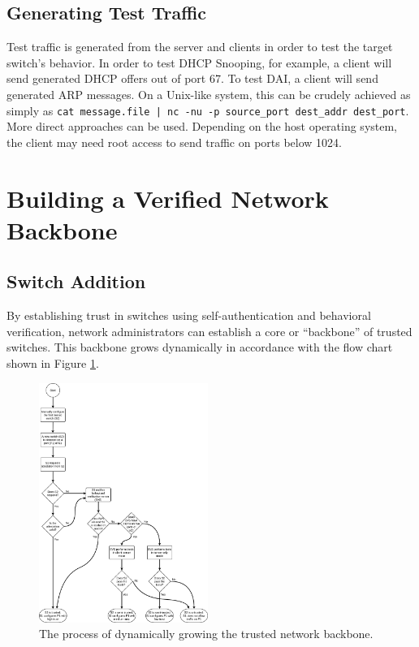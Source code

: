 \documentclass[journal]{IEEEtran}
\begin{document}
\subsection{Generating Test Traffic}
Test traffic is generated from the server and clients in order to test the target switch's behavior.
In order to test DHCP Snooping, for example, a client will send generated DHCP offers out of port
67. To test DAI, a client will send generated ARP messages. On a Unix-like system, this can be
crudely achieved as simply as \texttt{cat message.file | nc -nu -p source\_port dest\_addr
dest\_port}. More direct approaches can be used. Depending on the host operating system, the client
may need root access to send traffic on ports below 1024.


\section{Building a Verified Network Backbone}

\subsection{Switch Addition}
By establishing trust in switches using self-authentication and behavioral verification, network
administrators can establish a core or ``backbone'' of trusted switches. This backbone grows
dynamically in accordance with the flow chart shown in Figure \ref{fig:switch-addition}.

\begin{figure}[tbp]
\centerline{\includegraphics[width=0.49\textwidth]{images/switch-addition}}
\caption{The process of dynamically growing the trusted network backbone.}
\label{fig:switch-addition}
\end{figure}
\end{document}
